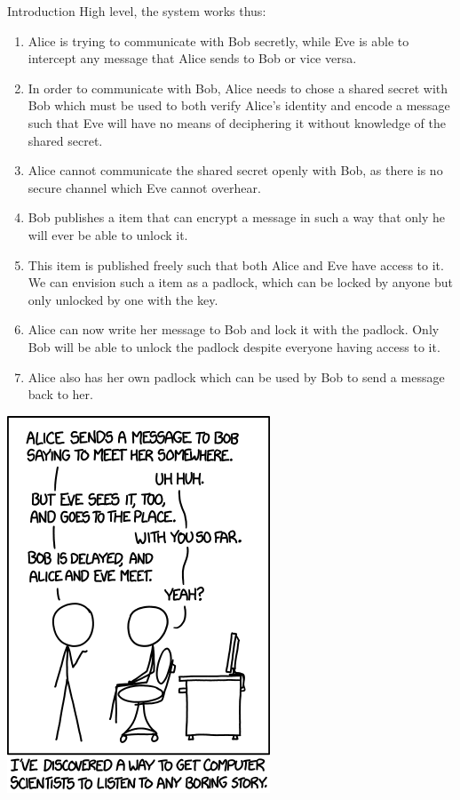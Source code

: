 \documentclass[landscape,fontscale=.8,paperwidth=24in,paperheight=18in]{baposter} %
\begin{document}
\begin{poster}
\begin{posterbox}[name=intro,column=0,below=objectives, span=13]{Introduction}
High level, the system works thus:
\begin{enumerate}
	\item Alice is trying to communicate with Bob secretly, while Eve is able to intercept any message that Alice sends to Bob or vice versa.
	\item In order to communicate with Bob, Alice needs to chose a shared secret with Bob which must be used to both verify Alice's identity and encode a message such that Eve will have no means of deciphering it without knowledge of the shared secret.
	\item Alice cannot communicate the shared secret openly with Bob, as there is no secure channel which Eve cannot overhear.
	\item Bob publishes a item that can encrypt a message in such a way that only he will ever be able to unlock it.
	\item This item is published freely such that both Alice and Eve have access to it. We can envision such a item as a padlock, which can be locked by anyone but only unlocked by one with the key.
	\item Alice can now write her message to Bob and lock it with the padlock. Only Bob will be able to unlock the padlock despite everyone having access to it.
	\item Alice also has her own padlock which can be used by Bob to send a message back to her.
\end{enumerate}

\begin{center}
\includegraphics[width=.5\linewidth]{xkcd.png}
\end{center}


\end{posterbox}
\end{poster}
\end{document}
